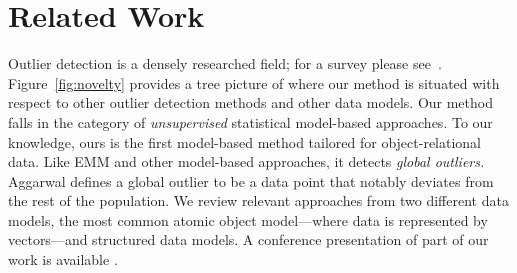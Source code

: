 {				\section{Related Work}
				Outlier detection is a densely researched field; for a survey please see~\citep{aggarwal2013,Akoglu2015}.
				Figure~\ref{fig:novelty} provides a tree picture of where our method is situated with respect to other outlier detection methods and other data models. 
				Our method falls in the category of {\em unsupervised} statistical model-based approaches. To our knowledge, ours is the first model-based method tailored for object-relational data. Like EMM and other model-based approaches, it detects {\em global outliers.} Aggarwal \citet{aggarwal2013} defines a global outlier to be a data point that notably deviates from the rest of the population. We review relevant approaches from two different data models, the most common atomic object model---where data is represented by vectors---and structured data models. A conference presentation of part of our work is available \citep{Riahi2015}. \\
				
}
